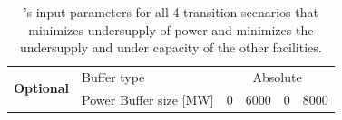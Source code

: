\begin{frame}
\begin{table}[]
{{\begin{tabular}{l|l|c|l|l|l}
        \multirow{2}{*}{\textbf{Optional}} & Buffer type                                                    & \multicolumn{4}{c}{Absolute}                                                                                                                                                                                                                                                               \\ \cline{2-6} 
                                                  & Power Buffer size [MW]                                                   & 0 & 6000 & 0 & 8000 \\ \hline
        \end{tabular}%
        }}
        \caption{\deploy's input parameters for all 4 transition scenarios
        that minimizes undersupply of power and minimizes 
        the undersupply and under capacity of the other facilities. }
        \label{tab:bestinputs}
        \end{table}
\end{frame}

